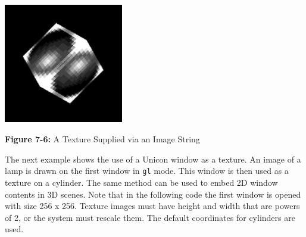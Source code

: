 \bigskip

{\centering 
\includegraphics[width=2.0508in,height=2.0571in]{ub-img/ub-img36.jpg}
\par}

{\sffamily\bfseries Figure 7-6:}
{\sffamily A Texture Supplied via an Image String}

\bigskip


The next example shows the use of a Unicon window as a texture. An
image of a lamp is drawn on the first window in
{\textquotedbl}\texttt{gl{\textquotedbl}} mode. This window is then
used as a texture on a cylinder. The same method can be
used to embed 2D window contents in 3D scenes. Note that in the
following code the first window is opened with size 256 x 256. Texture
images must have height and width that are powers of 2, or the system
must rescale them. The default coordinates for cylinders are used.

